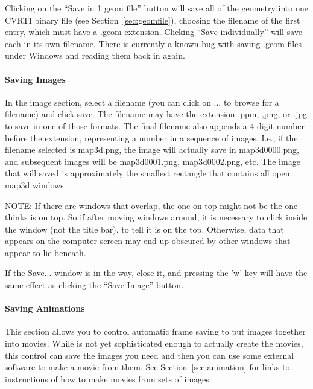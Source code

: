 Clicking on the ``Save in 1 geom file'' button will save all of the
geometry into one CVRTI binary file (see Section~\ref{sec:geomfile}),
choosing the filename of the first entry, which must have a .geom
extension.  Clicking ``Save individually'' will save each in its own
filename.  There is currently a known bug with saving .geom files under
Windows and reading them back in again.

\paragraph{Saving Images}
\label{sec:saveimages}

In the image section, select a filename (you can click on ... to browse for
a filename) and click save. The filename may have the extension .ppm, ,png,
or .jpg to save in one of those formats.  The final filename also appends a
4-digit number before the extension, representing a number in a sequence of
images.  I.e., if the filename selected is map3d.png, the image will
actually save in map3d0000.png, and subsequent images will be
map3d0001.png, map3d0002.png, etc.  The image that will saved is
approximately the smallest rectangle that contains all open map3d windows.

NOTE: If there are windows that overlap, the one on top might not be the one
\map{} thinks is on top.  So if after moving windows around, it is
necessary to click inside the
window (not the title bar), to tell \map{} it is on the top.  Otherwise,
data that appears on the computer screen may end up obscured by other
windows that appear to lie beneath. 

If the Save... window is in the way, close it, and pressing the 'w'
key will have the same effect as clicking the ``Save Image'' button. 

\paragraph{Saving Animations}
\label{sec:saveanimations}

This section allows you to control automatic frame saving to put images 
together into movies.  While \map{} is not yet sophisticated enough to 
actually create the movies, this control can save the images you need and
then you can use some external software to make a movie from them.
See Section~\ref{sec:animation} for links to instructions of how to make 
movies from sets of images. 

